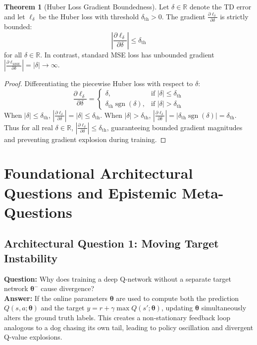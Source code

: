\documentclass[11pt,a4paper]{article}
\theoremstyle{definition}
\newtheorem{theorem}{\textbf{Theorem}}[section]
\begin{document}
\begin{theorem}[Huber Loss Gradient Boundedness]
Let $\delta \in \mathbb{R}$ denote the TD error and let $\ell_\delta$ be the Huber loss with threshold $\delta_{\text{th}} > 0$. The gradient $\frac{\partial \ell_\delta}{\partial \delta}$ is strictly bounded:
{\boldmath
\begin{equation}
\left| \frac{\partial \ell_\delta}{\partial \delta} \right| \le \delta_{\text{th}}
\end{equation}
}
for all $\delta \in \mathbb{R}$. In contrast, standard MSE loss has unbounded gradient $|\frac{\partial \ell_{\text{MSE}}}{\partial \delta}| = |\delta| \to \infty$.
\end{theorem}

\begin{proof}
Differentiating the piecewise Huber loss with respect to $\delta$:
{\boldmath
\begin{equation}
\frac{\partial \ell_\delta}{\partial \delta} = 
\begin{cases}
\delta, & \text{if } |\delta| \le \delta_{\text{th}} \\
\delta_{\text{th}} \operatorname{sgn}(\delta), & \text{if } |\delta| > \delta_{\text{th}}
\end{cases}
\end{equation}
}
When $|\delta| \le \delta_{\text{th}}$, $|\frac{\partial \ell_\delta}{\partial \delta}| = |\delta| \le \delta_{\text{th}}$.
When $|\delta| > \delta_{\text{th}}$, $|\frac{\partial \ell_\delta}{\partial \delta}| = |\delta_{\text{th}} \operatorname{sgn}(\delta)| = \delta_{\text{th}}$.
Thus for all real $\delta \in \mathbb{R}$, $|\frac{\partial \ell_\delta}{\partial \delta}| \le \delta_{\text{th}}$, guaranteeing bounded gradient magnitudes and preventing gradient explosion during training.
\end{proof}

\section{Foundational Architectural Questions and Epistemic Meta-Questions}

\subsection{Architectural Question 1: Moving Target Instability}
\textbf{Question:} Why does training a deep Q-network without a separate target network $\boldsymbol{\theta}^-$ cause divergence?\\
\textbf{Answer:} If the online parameters $\boldsymbol{\theta}$ are used to compute both the prediction $Q(s, a; \boldsymbol{\theta})$ and the target $y = r + \gamma \max Q(s'; \boldsymbol{\theta})$, updating $\boldsymbol{\theta}$ simultaneously alters the ground truth labels. This creates a non-stationary feedback loop analogous to a dog chasing its own tail, leading to policy oscillation and divergent Q-value explosions.
\end{document}
